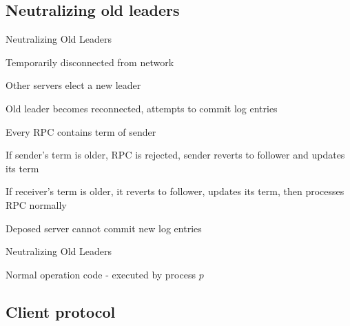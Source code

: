
\subsection{Neutralizing old leaders}

\begin{frame}{Neutralizing Old Leaders}
	
	\BI
	\item Temporarily disconnected from network
	\item Other servers elect a new leader
	\item Old leader becomes reconnected, attempts to commit log entries
	\EI

\medskip
{}
	\BI
	\item Every RPC contains term of sender
	\item If sender's term is older, RPC is rejected, sender reverts to follower and updates its term
	\item If receiver's term is older, it reverts to follower, updates its term, then processes RPC normally
	\EI

\medskip
{}
	\BI
	\item Deposed server cannot commit new log entries
	\EI

	
\end{frame}


\begin{frame}{Neutralizing Old Leaders}
	
\begin{Procedure}
\caption{Normal operation code - executed by process $p$}
\end{Procedure}
\end{frame}

\subsection{Client protocol}

